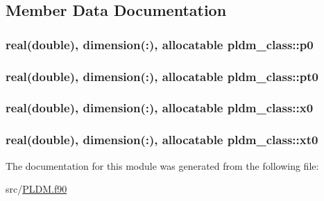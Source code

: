 \subsection{Member Data Documentation}
\hypertarget{classpldm__class_a4da9c01c7e463087a5f38764804dd0eb}{
\subsubsection[{p0}]{\setlength{\rightskip}{0pt plus 5cm}real(double), dimension(\-:), allocatable pldm\-\_\-class\-::p0\hspace{0.3cm}{\ttfamily [private]}}}\label{classpldm__class_a4da9c01c7e463087a5f38764804dd0eb}
\hypertarget{classpldm__class_a6f0729e807a28fab99053667439c375c}{
\subsubsection[{pt0}]{\setlength{\rightskip}{0pt plus 5cm}real(double), dimension(\-:), allocatable pldm\-\_\-class\-::pt0\hspace{0.3cm}{\ttfamily [private]}}}\label{classpldm__class_a6f0729e807a28fab99053667439c375c}
\hypertarget{classpldm__class_a66ae11e24219b080698059a797561bb4}{
\subsubsection[{x0}]{\setlength{\rightskip}{0pt plus 5cm}real(double), dimension(\-:), allocatable pldm\-\_\-class\-::x0\hspace{0.3cm}{\ttfamily [private]}}}\label{classpldm__class_a66ae11e24219b080698059a797561bb4}
\hypertarget{classpldm__class_a2f8d09296fcb6d486fb5a87e5a13276b}{
\subsubsection[{xt0}]{\setlength{\rightskip}{0pt plus 5cm}real(double), dimension(\-:), allocatable pldm\-\_\-class\-::xt0\hspace{0.3cm}{\ttfamily [private]}}}\label{classpldm__class_a2f8d09296fcb6d486fb5a87e5a13276b}


The documentation for this module was generated from the following file\-:\begin{DoxyCompactItemize}
\item 
src/\hyperlink{_p_l_d_m_8f90}{P\-L\-D\-M.\-f90}\end{DoxyCompactItemize}
